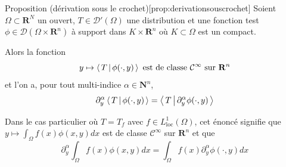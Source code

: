         \begin{omed}{Proposition (dérivation sous le crochet)}[prop:derivationsouscrochet]
            Soient $\Omega \subset \mathbf{R}^N$ un ouvert, $T \in \mathcal{D}'(\Omega)$ une distribution et une fonction test $\phi \in \mathcal{D}(\Omega \times \mathbf{R}^n)$ à support dans $K \times \mathbf{R}^n$ où $K \subset \Omega$ est un compact. 

            Alors la fonction 
            \[ y \mapsto \left< \, T \, \middle| \, \phi(\cdot , y) \, \right> \text{ est de classe } \mathcal{C}^{\infty} \text{ sur } \mathbf{R}^n \]
            et l’on a, pour tout multi-indice $\alpha \in \mathbf{N}^n$, 
            \[ \partial_y^{\alpha} \left< \, T \, \middle| \, \phi(\cdot,y) \, \right> = \left< \, T \, \middle| \, \partial_y^{\alpha} \phi(\cdot, y) \, \right> \]
        \end{omed}

        Dans le cas particulier où $T = T_f$ avec $f \in L^1_{\text{loc}}(\Omega)$, cet énoncé signifie que $y \mapsto \int_{\Omega} f(x) \phi(x,y) dx$ est de classe $\mathcal{C}^{\infty}$ sur $\mathbf{R}^n$ et que 
        \[ \partial_y^{\alpha} \int_{\Omega} f(x) \phi(x,y)dx = \int_{\Omega} f(x)\partial_y^{\alpha} \phi(\cdot, y)dx \]

